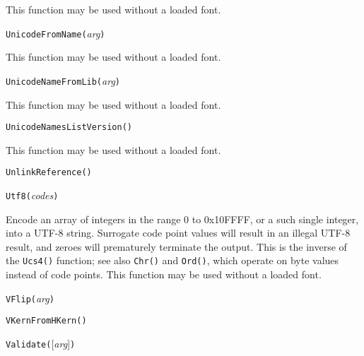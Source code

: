 This function may be used without a loaded font.



\texttt{UnicodeFromName(}\textit{arg}\texttt{)}

This function may be used without a loaded font.



\texttt{UnicodeNameFromLib(}\textit{arg}\texttt{)}

This function may be used without a loaded font.



\texttt{UnicodeNamesListVersion(}\texttt{)}

This function may be used without a loaded font.



\texttt{UnlinkReference(}\texttt{)}



\texttt{Utf8(}\textit{codes}\texttt{)}

Encode an array of integers in the range 0 to 0x10FFFF, or a such single
integer, into a UTF-8 string.  Surrogate code point values will result in
an illegal UTF-8 result, and zeroes will prematurely terminate the output. 
This is the inverse of the \texttt{Ucs4()} function; see also \texttt{Chr()}
and \texttt{Ord()}, which operate on byte values instead of code points. 
This function may be used without a loaded font.



\texttt{VFlip(}\textit{arg}\texttt{)}



\texttt{VKernFromHKern(}\texttt{)}



\texttt{Validate(}[\textit{arg}]\texttt{)}


